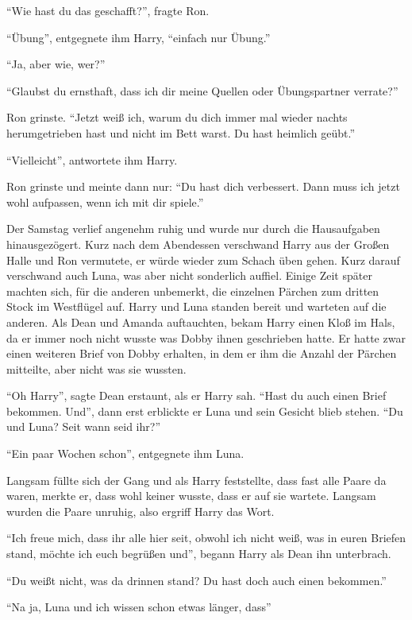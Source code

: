 \enquote{Wie hast du das geschafft?}, fragte Ron.

\enquote{Übung}, entgegnete ihm Harry, \enquote{einfach nur Übung.}

\enquote{Ja, aber wie, wer?}

\enquote{Glaubst du ernsthaft, dass ich dir meine Quellen oder Übungspartner verrate?}

Ron grinste. \enquote{Jetzt weiß ich, warum du dich immer mal wieder nachts herumgetrieben hast und nicht im Bett warst. Du hast heimlich geübt.}

\enquote{Vielleicht}, antwortete ihm Harry.

Ron grinste und meinte dann nur: \enquote{Du hast dich verbessert. Dann muss ich jetzt wohl aufpassen, wenn ich mit dir spiele.}

\trenn

Der Samstag verlief angenehm ruhig und wurde nur durch die Hausaufgaben hinausgezögert. Kurz nach dem Abendessen verschwand Harry aus der Großen Halle und Ron vermutete, er würde wieder zum Schach üben gehen. Kurz darauf verschwand auch Luna, was aber nicht sonderlich auffiel. Einige Zeit später machten sich, für die anderen unbemerkt, die einzelnen Pärchen zum dritten Stock im Westflügel auf. Harry und Luna standen bereit und warteten auf die anderen. Als Dean und Amanda auftauchten, bekam Harry einen Kloß im Hals, da er immer noch nicht wusste was Dobby ihnen geschrieben hatte. Er hatte zwar einen weiteren Brief von Dobby erhalten, in dem er ihm die Anzahl der Pärchen mitteilte, aber nicht was sie wussten.

\enquote{Oh Harry}, sagte Dean erstaunt, als er Harry sah. \enquote{Hast du auch einen Brief bekommen. Und}, dann erst erblickte er Luna und sein Gesicht blieb stehen. \enquote{Du und Luna? \gst Seit wann seid ihr?}

\enquote{Ein paar Wochen schon}, entgegnete ihm Luna.

Langsam füllte sich der Gang und als Harry feststellte, dass fast alle Paare da waren, merkte er, dass wohl keiner wusste, dass er auf sie wartete. Langsam wurden die Paare unruhig, also ergriff Harry das Wort.

\enquote{Ich freue mich, dass ihr alle hier seit, obwohl ich nicht weiß, was in euren Briefen stand, möchte ich euch begrüßen und}, begann Harry als Dean ihn unterbrach.

\enquote{Du weißt nicht, was da drinnen stand? Du hast doch auch einen bekommen.}

\enquote{Na ja, Luna und ich wissen schon etwas länger, dass\abs}


